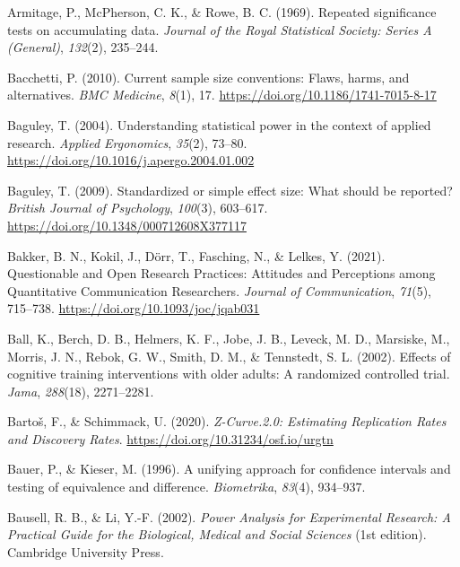 \documentclass[
  letterpaper,
  DIV=11,
  numbers=noendperiod]{scrreprt}
\newlength{\cslhangindent}
\newlength{\cslentryspacingunit} %
\newenvironment{CSLReferences}[2] %
 {%
  \setlength{\parindent}{0pt}
  \ifodd #1
  \let\oldpar\par
  \def\par{\hangindent=\cslhangindent\oldpar}
  \fi
  \setlength{\parskip}{#2\cslentryspacingunit}
 }%
 {}
\begin{document}
\begin{CSLReferences}{1}{0}
\leavevmode{}%
Armitage, P., McPherson, C. K., \& Rowe, B. C. (1969). Repeated
significance tests on accumulating data. \emph{Journal of the Royal
Statistical Society: Series A (General)}, \emph{132}(2), 235--244.

\leavevmode{}%
Bacchetti, P. (2010). Current sample size conventions: {Flaws}, harms,
and alternatives. \emph{BMC Medicine}, \emph{8}(1), 17.
\url{https://doi.org/10.1186/1741-7015-8-17}

\leavevmode{}%
Baguley, T. (2004). Understanding statistical power in the context of
applied research. \emph{Applied Ergonomics}, \emph{35}(2), 73--80.
\url{https://doi.org/10.1016/j.apergo.2004.01.002}

\leavevmode{}%
Baguley, T. (2009). Standardized or simple effect size: {What} should be
reported? \emph{British Journal of Psychology}, \emph{100}(3), 603--617.
\url{https://doi.org/10.1348/000712608X377117}

\leavevmode{}%
Bakker, B. N., Kokil, J., Dörr, T., Fasching, N., \& Lelkes, Y. (2021).
Questionable and {Open Research Practices}: {Attitudes} and
{Perceptions} among {Quantitative Communication Researchers}.
\emph{Journal of Communication}, \emph{71}(5), 715--738.
\url{https://doi.org/10.1093/joc/jqab031}

\leavevmode{}%
Ball, K., Berch, D. B., Helmers, K. F., Jobe, J. B., Leveck, M. D.,
Marsiske, M., Morris, J. N., Rebok, G. W., Smith, D. M., \& Tennstedt,
S. L. (2002). Effects of cognitive training interventions with older
adults: A randomized controlled trial. \emph{Jama}, \emph{288}(18),
2271--2281.

\leavevmode{}%
Bartoš, F., \& Schimmack, U. (2020). \emph{Z-{Curve}.2.0: {Estimating
Replication Rates} and {Discovery Rates}}.
\url{https://doi.org/10.31234/osf.io/urgtn}

\leavevmode{}%
Bauer, P., \& Kieser, M. (1996). A unifying approach for confidence
intervals and testing of equivalence and difference. \emph{Biometrika},
\emph{83}(4), 934--937.

\leavevmode{}%
Bausell, R. B., \& Li, Y.-F. (2002). \emph{Power {Analysis} for
{Experimental Research}: {A Practical Guide} for the {Biological},
{Medical} and {Social Sciences}} (1st edition). {Cambridge University
Press}.


\end{CSLReferences}
\end{document}
